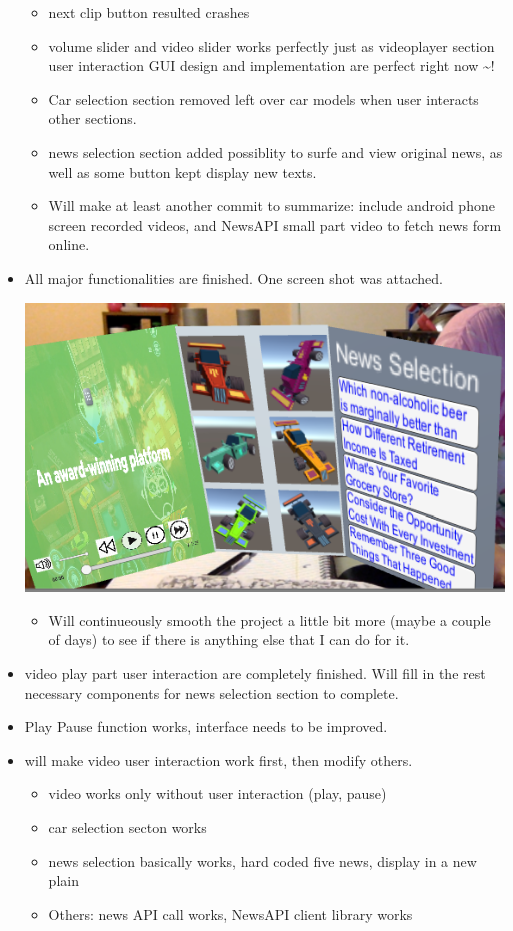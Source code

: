 \documentclass[9pt, b5paper]{article}
\begin{document}
\begin{itemize}
\begin{itemize}
\item next clip button resulted crashes
\item volume slider and video slider works perfectly just as videoplayer section user interaction GUI design and implementation are perfect right now \textasciitilde{}!
\item Car selection section removed left over car models when user interacts other sections.
\item news selection section added possiblity to surfe and view original news, as well as some button kept display new texts.
\item Will make at least another commit to summarize: include android phone screen recorded videos, and NewsAPI small part video to fetch news form online.
\end{itemize}
\item All major functionalities are finished. One screen shot was attached. 

\includegraphics[width=.9\linewidth]{./pic/one.png}
\begin{itemize}
\item Will continueously smooth the project a little bit more (maybe a couple of days) to see if there is anything else that I can do for it.
\end{itemize}
\item video play part user interaction are completely finished. Will fill in the rest necessary components for news selection section to complete.
\item Play Pause function works, interface needs to be improved.
\item will make video user interaction work first, then modify others. 
\begin{itemize}
\item video works only without user interaction (play, pause)
\item car selection secton works
\item news selection basically works, hard coded five news, display in a new plain
\item Others: news API call works, NewsAPI client library works
\end{itemize}
\end{itemize}
\end{document}
